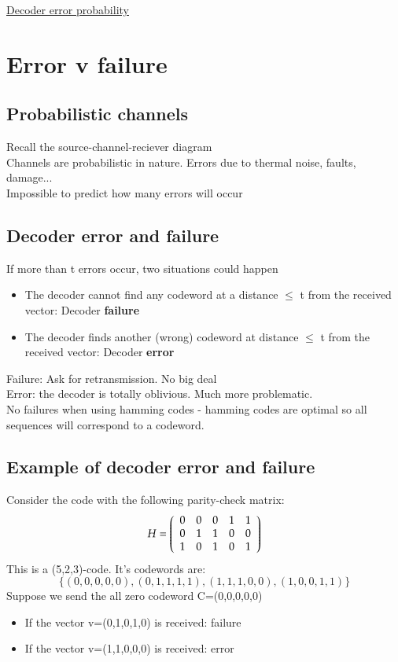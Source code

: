 \documentclass{article}[18pt]
\begin{document}
\begin{center}
\underline{\huge Decoder error probability}
\end{center}
\section{Error v failure}
\subsection{Probabilistic channels}
Recall the source-channel-reciever diagram\\
Channels are probabilistic in nature. Errors due to thermal noise, faults, damage...\\
Impossible to predict how many errors will occur
\subsection{Decoder error and failure}
If more than t errors occur, two situations could happen
\begin{itemize}
	\item The decoder cannot find any codeword at a distance $\leqslant$ t from the received vector: Decoder \textbf{failure}
	\item The decoder finds another (wrong) codeword at distance $\leqslant$ t from the received vector: Decoder \textbf{error}
\end{itemize}
Failure: Ask for retransmission. No big deal\\
Error: the decoder is totally oblivious. Much more problematic.\\
No failures when using hamming codes - hamming codes are optimal so all sequences will correspond to a codeword.
\subsection{Example of decoder error and failure}
Consider the code with the following parity-check matrix:
$$H = \left( \begin{array} { l l l l l } { 0 } & { 0 } & { 0 } & { 1 } & { 1 } \\ { 0 } & { 1 } & { 1 } & { 0 } & { 0 } \\ { 1 } & { 0 } & { 1 } & { 0 } & { 1 } \end{array} \right)$$
This is a (5,2,3)-code. It's codewords are:
$$\{ ( 0,0,0,0,0 ) , ( 0,1,1,1,1 ) , ( 1,1,1,0,0 ) , ( 1,0,0,1,1 ) \}$$
Suppose we send the all zero codeword C=(0,0,0,0,0)
\begin{itemize}
	\item If the vector v=(0,1,0,1,0) is received: failure
	\item If the vector v=(1,1,0,0,0) is received: error
\end{itemize}
\end{document}
